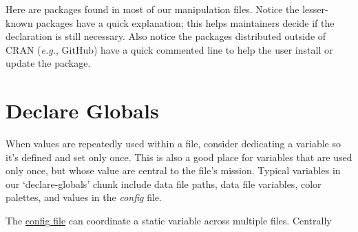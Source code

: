 \documentclass[]{book}
\newenvironment{Shaded}{\begin{snugshade}}{\end{snugshade}}
\newcommand{\CommentTok}[1]{\textcolor[rgb]{0.56,0.35,0.01}{\textit{#1}}}
\newcommand{\KeywordTok}[1]{\textcolor[rgb]{0.13,0.29,0.53}{\textbf{#1}}}
\newcommand{\NormalTok}[1]{#1}
\newcommand{\OperatorTok}[1]{\textcolor[rgb]{0.81,0.36,0.00}{\textbf{#1}}}
\newcommand{\StringTok}[1]{\textcolor[rgb]{0.31,0.60,0.02}{#1}}
\begin{document}
Here are packages found in most of our manipulation files. Notice the lesser-known packages have a quick explanation; this helps maintainers decide if the declaration is still necessary. Also notice the packages distributed outside of CRAN (\emph{e.g.}, GitHub) have a quick commented line to help the user install or update the package.

\begin{Shaded}
\end{Shaded}

\hypertarget{declare-globals}{%
\section{Declare Globals}\label{declare-globals}}

When values are repeatedly used within a file, consider dedicating a variable so it's defined and set only once. This is also a good place for variables that are used only once, but whose value are central to the file's mission. Typical variables in our `declare-globals' chunk include data file paths, data file variables, color palettes, and values in the \emph{config} file.

The \protect\hyperlink{repo-root}{config file} can coordinate a static variable across multiple files. Centrally
\end{document}
